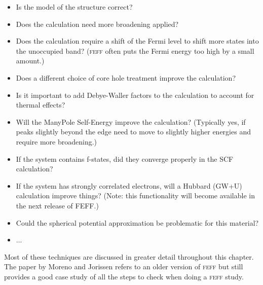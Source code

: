 \documentclass[11pt,oneside]{report} %
\newcommand{\program}[1]{\textsc{#1}}
\newcommand{\feff}{\program{feff}}
\begin{document}
\begin{itemize} \tightlist
\item Is the model of the structure correct?
\item Does the calculation need more broadening applied?
\item Does the calculation require a shift of the Fermi level to shift more states into the unoccupied band?  ({\feff} often puts the Fermi energy too high by a small amount.)
\item Does a different choice of core hole treatment improve the calculation?
\item Is it important to add Debye-Waller factors to the calculation to account for thermal effects?
\item Will the ManyPole Self-Energy improve the calculation?  (Typically yes, if peaks slightly beyond the edge need to move to slightly higher energies and require more broadening.)
\item If the system contains f-states, did they converge properly in the SCF calculation?
\item If the system has strongly correlated electrons, will a Hubbard (GW+U) calculation improve things?  (Note: this functionality will become available in the next release of FEFF.)
\item Could the spherical potential approximation be problematic for this material?
\item ...
\end{itemize}


Most of these techniques are discussed in greater detail throughout this chapter.  The paper by Moreno and Jorissen refers to an older version of {\feff} but still provides a good case study of all the steps to check when doing a {\feff} study.
\end{document}
